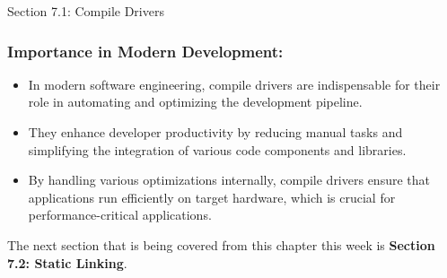 \begin{notes}{Section 7.1: Compile Drivers}
    \subsubsection*{Importance in Modern Development:}
    
    \begin{itemize}
        \item In modern software engineering, compile drivers are indispensable for their role in automating and optimizing the development pipeline.
        \item They enhance developer productivity by reducing manual tasks and simplifying the integration of various code components and libraries.
        \item By handling various optimizations internally, compile drivers ensure that applications run efficiently on target hardware, which is crucial for performance-critical applications.
    \end{itemize}
\end{notes}

The next section that is being covered from this chapter this week is \textbf{Section 7.2: Static Linking}.

